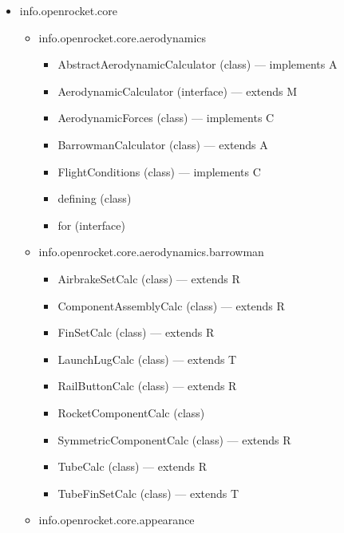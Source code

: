 \documentclass{amsdtx}
\begin{document}
\begin{itemize}
\item
  info.openrocket.core

  \begin{itemize}
  
  \item
    info.openrocket.core.aerodynamics

    \begin{itemize}
    
    \item
      AbstractAerodynamicCalculator (class) --- implements A
    \item
      AerodynamicCalculator (interface) --- extends M
    \item
      AerodynamicForces (class) --- implements C
    \item
      BarrowmanCalculator (class) --- extends A
    \item
      FlightConditions (class) --- implements C
    \item
      defining (class)
    \item
      for (interface)
    \end{itemize}
  \item
    info.openrocket.core.aerodynamics.barrowman

    \begin{itemize}
    
    \item
      AirbrakeSetCalc (class) --- extends R
    \item
      ComponentAssemblyCalc (class) --- extends R
    \item
      FinSetCalc (class) --- extends R
    \item
      LaunchLugCalc (class) --- extends T
    \item
      RailButtonCalc (class) --- extends R
    \item
      RocketComponentCalc (class)
    \item
      SymmetricComponentCalc (class) --- extends R
    \item
      TubeCalc (class) --- extends R
    \item
      TubeFinSetCalc (class) --- extends T
    \end{itemize}
  \item
    info.openrocket.core.appearance

    \begin{itemize}
    

\end{itemize}
\end{itemize}
\end{itemize}
\end{document}
